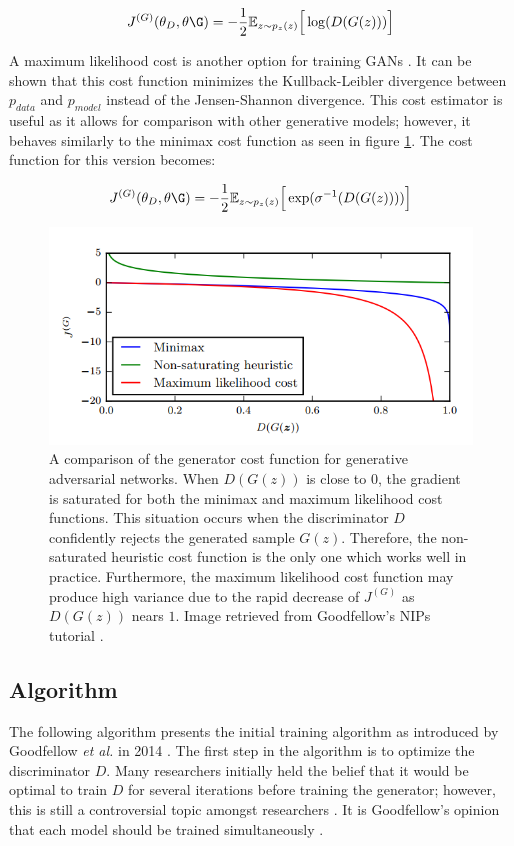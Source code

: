 \documentclass[11pt]{article}
\begin{document}
$$J^{(G)}(\theta_D,\theta\G) = -\frac{1}{2}\mathbb{E}_{z\sim p_{z}(z)}\Big[\log(D(G(z)))\Big]$$

A maximum likelihood cost is another option for training GANs \citep{2017arXiv170100160G}. It can be shown that this cost function minimizes the Kullback-Leibler divergence between $p_{data}$ and $p_{model}$ instead of the Jensen-Shannon divergence. This cost estimator is useful as it allows for comparison with other generative models; however, it behaves similarly to the minimax cost function as seen in figure \ref{fig:CostFunc}. The cost function for this version becomes:

$$J^{(G)}(\theta_D,\theta\G) = -\frac{1}{2}\mathbb{E}_{z\sim p_{z}(z)}\Big[\exp(\sigma^{-1}(D(G(z))))\Big]$$

\begin{figure}
\centering
\includegraphics[scale=0.5]{costfunc}
\caption{A comparison of the generator cost function for generative adversarial networks. When $D(G(z))$ is close to $0$, the gradient is saturated for both the minimax and maximum likelihood cost functions. This situation occurs when the discriminator $D$ confidently rejects the generated sample $G(z)$. Therefore, the non-saturated heuristic cost function is the only one which works well in practice. Furthermore, the maximum likelihood cost function may produce high variance due to the rapid decrease of $J^{(G)}$ as $D(G(z))$ nears $1$. Image retrieved from Goodfellow's NIPs tutorial \citep{2017arXiv170100160G}.}
\label{fig:CostFunc}
\end{figure}

\subsection{Algorithm}
The following algorithm presents the initial training algorithm as introduced by Goodfellow \textit{et al.} in 2014 \citep{2014arXiv1406.2661G}. The first step in the algorithm is to optimize the discriminator $D$. Many researchers initially held the belief that it would be optimal to train $D$ for several iterations before training the generator; however, this is still a controversial topic amongst researchers \citep{2017arXiv170100160G}. It is Goodfellow's opinion that each model should be trained simultaneously \citep{2017arXiv170100160G}.
\end{document}
